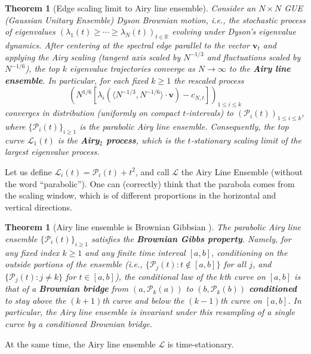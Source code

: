 \documentclass[letterpaper,11pt,oneside,reqno]{article}
\numberwithin{equation}{section}
\newtheorem{theorem}[proposition]{Theorem}
\theoremstyle{definition}
\begin{document}
\begin{theorem}[Edge scaling limit to Airy line ensemble]
	Consider an $N\times N$ GUE (Gaussian Unitary Ensemble) Dyson Brownian motion, i.e., the stochastic process of eigenvalues $(\lambda_1(t)\ge \cdots\ge \lambda_N(t))_{t\in\mathbb{R}}$ evolving under Dyson's eigenvalue dynamics. After centering at the spectral edge parallel to the vector $\mathbf{v}_t$ and applying the
Airy scaling (tangent axis scaled by $N^{-1/3}$ and fluctuations scaled by $N^{-1/6}$), the top $k$ eigenvalue trajectories converge as $N\to\infty$ to the \textbf{Airy line ensemble}. In particular, for each fixed $k\ge1$ the rescaled process $$(N^{1/6}[\lambda_i(\langle
			N^{-1/3},N^{-1/6}
\rangle \cdot \mathbf{v})-c_{N,t}])_{1\le i\le k}$$ converges in distribution (uniformly on compact $t$-intervals) to $(\mathcal{P}_i(t))_{1\le i\le k}$, where $\{\mathcal{P}_i(t)\}_{i\ge1}$ is the parabolic Airy line ensemble. Consequently, the top curve $\mathcal{L}_1(t)$ is the \textbf{Airy$_2$ process}, which is the $t$-stationary scaling limit of the largest eigenvalue process.
\end{theorem}

Let us define $\mathcal{L}_i(t)=\mathcal{P}_i(t)+t^2$, and call $\mathcal{L}$ the Airy Line Ensemble
(without the word ``parabolic''). One can (correctly) think that the parabola comes
from the scaling window, which is of different proportions in the horizontal and vertical directions.

\begin{theorem}[Airy line ensemble is Brownian Gibbsian \cite{CorwinHammond2013}]
The parabolic Airy line ensemble $\{\mathcal{P}_i(t)\}_{i\ge1}$ satisfies the \textbf{Brownian Gibbs property}. Namely, for any fixed index $k\ge1$ and any finite time interval $[a,b]$, conditioning on the outside portions of the ensemble (i.e., $\{\mathcal{P}_j(t): t\notin[a,b]\}$ for all $j$, and $\{\mathcal{P}_j(t): j\neq k\}$ for $t\in[a,b]$), the conditional law of the $k$th curve on $[a,b]$ is that of a \textbf{Brownian bridge} from $(a,\mathcal{P}_k(a))$ to $(b,\mathcal{P}_k(b))$ \textbf{conditioned} to stay above the $(k+1)$th curve and below the $(k-1)$th curve on $[a,b]$. In particular, the Airy line ensemble is invariant under this resampling of a single curve by a conditioned Brownian bridge.
\end{theorem}

At the same time, the Airy line ensemble $\mathcal{L}$ is time-stationary.
\end{document}
